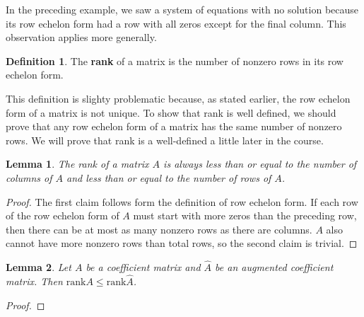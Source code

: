\documentclass[12pt,reqno]{amsart}
\newcommand{\rank}{\mathrm{rank}}
\newtheorem{lemma}{Lemma}[section]
\theoremstyle{definition}
\newtheorem{definition}{Definition}[section]
\begin{document}
In the preceding example, we saw a system of equations with no
solution because its row echelon form had a row with all zeros except
for the final column. This observation applies more generally. 
\begin{definition}
  The \textbf{rank} of a matrix is the number of nonzero rows in its
  row echelon form. 
\end{definition}
This definition is slighty problematic because, as stated earlier, the
row echelon form of a matrix is not unique. To show that rank is well
defined, we should prove that any row echelon form of a matrix has the
same number of nonzero rows. We will prove that rank is a well-defined
a little later in the course. 
\begin{lemma}\label{lem:rankcr}
  The rank of a matrix $A$ is always less than or equal to the number
  of columns of $A$ and less than or equal to the number of rows of $A$.
\end{lemma}
\begin{proof}
  The first claim follows form the definition of row echelon form. If
  each row of the row echelon form of $A$ must start with more zeros
  than the preceding row, then there can be at most as many nonzero
  rows as there are columns. $A$ also cannot have more nonzero rows
  than total rows, so the second claim is trivial.
\end{proof}
\begin{lemma}\label{lem:rankaug}
  Let $A$ be a coefficient matrix and $\hat{A}$ be an augmented
  coefficient matrix. Then $\rank A \leq \rank \hat{A}$.
\end{lemma}
\begin{proof}

\end{proof}
\end{document}
